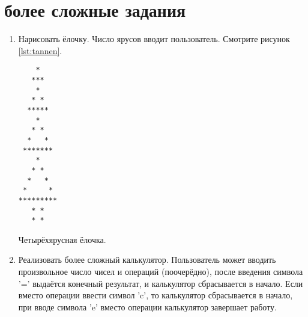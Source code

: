 \documentclass[12pt]{article}
\begin{document}
 \section{более сложные задания}
 \begin{enumerate}
  \item Нарисовать ёлочку. Число ярусов вводит пользователь. Смотрите рисунок \ref{lst:tannen}.
\begin{listing}[H]
\begin{center}
\begin{verbatim}
    *
   ***
    *
   * *
  *****
    *
   * *
  *   *
 *******
    *
   * *
  *   *
 *     *
*********
   * *
   * *
\end{verbatim}
\end{center}

\caption{Четырёхярусная ёлочка.}
\label{lst:tannen}
\end{listing}

  \item Реализовать более сложный калькулятор. Пользователь может вводить произвольное число чисел и операций (поочерёдно), после введения символа '=' выдаётся конечный результат, и калькулятор сбрасывается в начало. Если вместо операции ввести символ 'c', то калькулятор сбрасывается в начало, при вводе символа 'e' вместо операции калькулятор завершает работу.  
 \end{enumerate}
\end{document}
